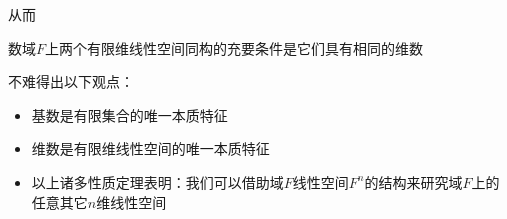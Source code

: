 从而
\begin{theorem}
    数域$F$上两个有限维线性空间同构的充要条件是它们具有相同的维数
\end{theorem}
不难得出以下观点：
\begin{itemize}
    \item 基数是有限集合的唯一本质特征
    \item 维数是有限维线性空间的唯一本质特征
    \item 以上诸多性质定理表明：我们可以借助域$F$线性空间$F^n$的结构来研究域$F$上的任意其它$n$维线性空间
\end{itemize}
